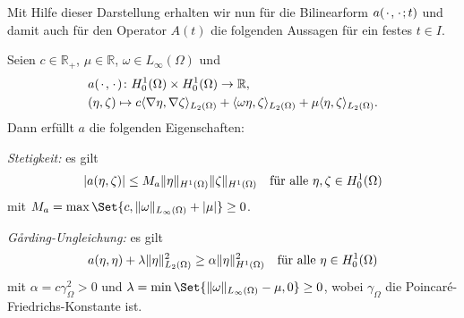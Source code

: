 Mit Hilfe dieser Darstellung erhalten wir nun für die Bilinearform $a({\mkern2mu\cdot\mkern2mu}, {\mkern2mu\cdot\mkern2mu}; t)$ und damit auch für den Operator $A(t)$ die folgenden Aussagen für ein festes $t \in I$.
%
\begin{Satz}
\label{satz:pp:a_bf_bounded_garding}
    Seien $c \in \mathbb{R}_{+}$, $\mu \in \mathbb{R}$, $\omega \in L_{\infty}(\Omega)$ und
    \begin{equation}
    \label{eq:bf_a}
        \begin{aligned}
            &a({\mkern2mu\cdot\mkern2mu}, {\mkern2mu\cdot\mkern2mu}) \colon H^{1}_{0}(\Omega) \times H^{1}_{0}(\Omega) \to \mathbb{R}, \\
            &(\eta, \zeta) \mapsto c\langle\nabla \eta,\nabla \zeta\rangle_{L_{2}(\Omega)} + \langle\omega \eta,\zeta\rangle_{L_{2}(\Omega)} + \mu \langle\eta,\zeta\rangle_{L_{2}(\Omega)}.
        \end{aligned}
    \end{equation}
    Dann erfüllt $a$ die folgenden Eigenschaften:
    \begin{thmenumerate}
        \item\label{satz:pp:a_bf_bounded_garding:1}
        \emph{Stetigkeit:} es gilt
        \begin{equation}
            \lvert a(\eta, \zeta)\rvert \leq M_{a} \lVert\eta\rVert_{H^{1}(\Omega)} \lVert\zeta\rVert_{H^{1}(\Omega)} \quad \text{für alle}~\eta, \zeta \in H^{1}_{0}(\Omega)
        \end{equation}
        mit $M_{a} = \max\Set{c, \norm{\omega}_{L_{\infty}(\Omega)} + \abs{\mu}} \geq 0$.
        \item\label{satz:pp:a_bf_bounded_garding:2}
        \emph{G\aa{}rding-Ungleichung:} es gilt
        \begin{equation}
                a(\eta, \eta) + \lambda \lVert\eta\rVert_{L_{2}(\Omega)}^{2} \geq \alpha \lVert\eta\rVert_{H^{1}(\Omega)}^{2} \quad \text{für alle}~\eta \in H^{1}_{0}(\Omega)
        \end{equation}
        mit $\alpha = c \gamma_{\Omega}^{2} > 0$ und $\lambda = \min\Set{\norm{\omega}_{L_{\infty}(\Omega)} - \mu, 0} \geq 0$, wobei $\gamma_{\Omega}$ die Poincaré-Friedrichs-Konstante ist.
    \end{thmenumerate}


\end{Satz}
